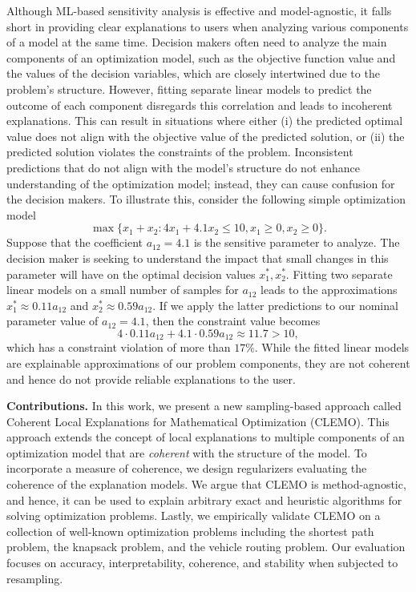 \documentclass{article}
\theoremstyle{plain}
\theoremstyle{definition}
\theoremstyle{remark}
\begin{document}
Although ML-based sensitivity analysis is effective and model-agnostic, it falls short in providing clear explanations to users when analyzing various components of a model at the same time. Decision makers often need to analyze the main components of an optimization model, such as the objective function value and the values of the decision variables, which are closely intertwined due to the problem's structure. However, fitting separate linear models to predict the outcome of each component disregards this correlation and leads to incoherent explanations. This can result in situations where either (i) the predicted optimal value does not align with the objective value of the predicted solution, or (ii) the predicted solution violates the constraints of the problem. Inconsistent predictions that do not align with the model's structure do not enhance understanding of the optimization model; instead, they can cause confusion for the decision makers. To illustrate this, consider the following simple optimization model
\[
\max\{x_1 + x_2 : 4x_1 + 4.1x_2 \le 10, x_1 \geq 0, x_2 \geq 0\}.
\]
Suppose that 
the coefficient $a_{12}=4.1$ is the sensitive parameter to analyze. The decision maker is seeking to understand the impact that small changes in this parameter will have on the optimal decision values $x_1^*,x_2^*$. Fitting two separate linear models on a small number of samples for $a_{12}$ leads to the approximations $x_1^* \approx  0.11a_{12}$ and $x_2^* \approx  0.59a_{12}$. If we apply the latter predictions to our nominal parameter value of $a_{12}=4.1$, then the constraint value becomes 
\[
4\cdot 0.11a_{12} + 4.1\cdot 0.59a_{12} \approx 11.7 > 10,
\]
which has a constraint violation of more than $17\%$. While the fitted linear models are explainable approximations of our problem components, they are not coherent and hence do not provide reliable explanations to the user.   

\textbf{Contributions.} In this work, we present a new sampling-based approach called Coherent Local Explanations for Mathematical Optimization (CLEMO). This approach extends the concept of local explanations to multiple components of an optimization model that are \textit{coherent} with the structure of the model. To incorporate a measure of coherence, we design regularizers evaluating the coherence of the explanation models. We argue that CLEMO is method-agnostic, and hence, it can be used to explain arbitrary exact and heuristic algorithms for solving optimization problems. Lastly, we empirically validate CLEMO on a collection of well-known optimization problems including the shortest path problem, the knapsack problem, and the vehicle routing problem. Our evaluation focuses on accuracy, interpretability, coherence, and stability when subjected to resampling.
\end{document}
